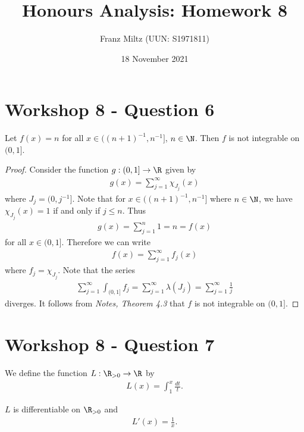 \documentclass{article}
\begin{document}
\title{Honours Analysis: Homework 8}
\author{Franz Miltz (UUN: S1971811)}
\date{18 November 2021}
\maketitle

\section*{Workshop 8 - Question 6}

\begin{claim*}
	Let $f(x)=n$ for all $x\in((n+1)^{-1}, n^{-1}]$, $n\in\N$. Then $f$ is not integrable on
	$(0,1]$.
\end{claim*}
\begin{proof}
	Consider the function $g:(0,1]\to\R$ given by
	\begin{align*}
		g(x) = \sum_{j=1}^\infty \chi_{J_j}(x)
	\end{align*}
	where $J_j = (0, j^{-1}]$. Note that for $x\in((n+1)^{-1}, n^{-1}]$ where $n\in\N$,
	we have $\chi_{J_j}(x)=1$ if and only if $j\leq n$. Thus
	\begin{align*}
		g(x) = \sum_{j=1}^n 1 = n = f(x)
	\end{align*}
	for all $x\in(0,1]$. Therefore we can write
	\begin{align*}
		f(x) = \sum_{j=1}^\infty f_j(x)
	\end{align*}
	where $f_j=\chi_{J_j}$. Note that the series
	\begin{align*}
		\sum_{j=1}^\infty \int_{(0,1]} f_j = \sum_{j=1}^\infty \lambda(J_j)
		= \sum_{j=1}^\infty \frac{1}{j}
	\end{align*}
	diverges. It follows from \emph{Notes, Theorem 4.3} that $f$ is not integrable on $(0,1]$.
\end{proof}

\section*{Workshop 8 - Question 7}

We define the function $L:\R_{>0}\to\R$ by
\begin{align*}
	L(x) = \int_1^x \frac{dt}{t}.
\end{align*}

\begin{claim*}
	$L$ is differentiable on $\R_{>0}$ and
	\begin{align}
		\label{deriv}
		L'(x) = \frac{1}{x}.
	\end{align}
\end{claim*}
\end{document}
